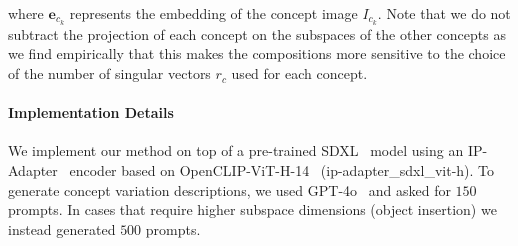 where \( \mathbf{e}_{c_k} \) represents the embedding of the concept image \( I_{c_k} \). Note that we do not subtract the projection of each concept on the subspaces of the other concepts as we find empirically that this makes the compositions more sensitive to the choice of the number of singular vectors $r_c$ used for each concept.




\paragraph{\textbf{Implementation Details}} We implement our method on top of a pre-trained SDXL~\cite{podell2024sdxl} model using an IP-Adapter~\cite{ye2023ipadapter} encoder based on OpenCLIP-ViT-H-14~\cite{ilharco_gabriel_2021_5143773} (ip-adapter\_sdxl\_vit-h). To generate concept variation descriptions, we used GPT-4o~\cite{OpenAI2022ChatGPT} and asked for $150$ prompts. In cases that require higher subspace dimensions (\eg object insertion) we instead generated $500$ prompts.

